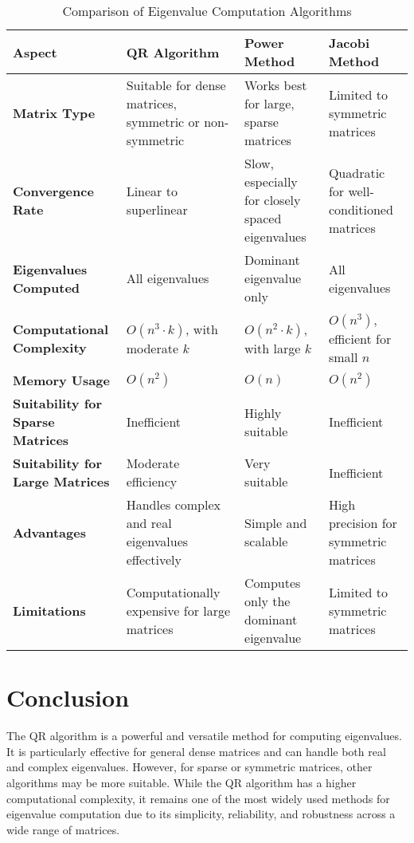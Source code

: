 \documentclass[a4paper,12pt]{report}
\begin{document}
\begin{table}[H]
\centering
\renewcommand{\arraystretch}{1.5} %
\setlength{\tabcolsep}{8pt} %
\begin{tabular}{|p{3cm}|p{4cm}|p{4cm}|p{4cm}|}
\hline
\textbf{Aspect} & \textbf{QR Algorithm} & \textbf{Power Method} & \textbf{Jacobi Method} \\ \hline
\textbf{Matrix Type} 
& Suitable for dense matrices, symmetric or non-symmetric 
& Works best for large, sparse matrices 
& Limited to symmetric matrices \\ \hline

\textbf{Convergence Rate} 
& Linear to superlinear 
& Slow, especially for closely spaced eigenvalues 
& Quadratic for well-conditioned matrices \\ \hline

\textbf{Eigenvalues Computed} 
& All eigenvalues 
& Dominant eigenvalue only 
& All eigenvalues \\ \hline

\textbf{Computational Complexity} 
& \(O(n^3 \cdot k)\), with moderate \(k\) 
& \(O(n^2 \cdot k)\), with large \(k\) 
& \(O(n^3)\), efficient for small \(n\) \\ \hline

\textbf{Memory Usage} 
& \(O(n^2)\) 
& \(O(n)\) 
& \(O(n^2)\) \\ \hline

\textbf{Suitability for Sparse Matrices} 
& Inefficient 
& Highly suitable 
& Inefficient \\ \hline

\textbf{Suitability for Large Matrices} 
& Moderate efficiency 
& Very suitable 
& Inefficient \\ \hline

\textbf{Advantages} 
& Handles complex and real eigenvalues effectively 
& Simple and scalable 
& High precision for symmetric matrices \\ \hline

\textbf{Limitations} 
& Computationally expensive for large matrices 
& Computes only the dominant eigenvalue 
& Limited to symmetric matrices \\ \hline
\end{tabular}
\caption{Comparison of Eigenvalue Computation Algorithms}
\label{tab:algorithm_comparison}
\end{table}


\section*{\textcolor{myblue}{Conclusion}}

The QR algorithm is a powerful and versatile method for computing eigenvalues. It is particularly effective for general dense matrices and can handle both real and complex eigenvalues. However, for sparse or symmetric matrices, other algorithms may be more suitable. While the QR algorithm has a higher computational complexity, it remains one of the most widely used methods for eigenvalue computation due to its simplicity, reliability, and robustness across a wide range of matrices.
\end{document}
